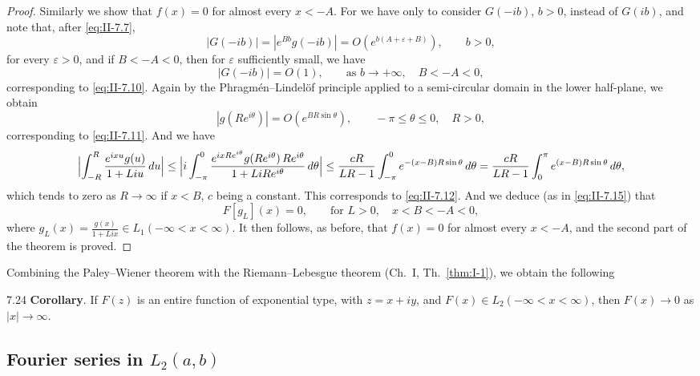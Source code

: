 \begin{proof}
Similarly we show that $f(x)=0$ for almost every $x<-A$. For we have only to consider $G(-ib)$, $b>0$, instead of $G(ib)$, and note that, after \eqref{eq:II-7.7},
\begin{equation}\tag{7.20}\label{eq:II-7.20}
|G(-ib)|=|e^{Bb}g(-ib)|=O(e^{b(A+\varepsilon+B)}),\qquad b>0,
\end{equation}
for every $\varepsilon>0$, and if $B<-A<0$, then for $\varepsilon$ sufficiently small, we have
\begin{equation}\tag{7.21}\label{eq:II-7.21}
|G(-ib)|=O(1),\qquad\text{as }b\to+\infty,\quad B<-A<0,
\end{equation}
corresponding to \eqref{eq:II-7.10}. Again by the Phragm\'en--Lindel\"of principle applied to a semi-circular domain in the lower half-plane, we obtain
\begin{equation}\tag{7.22}\label{eq:II-7.22}
|g(Re^{i\theta})|=O(e^{BR\sin\theta}),\qquad -\pi\le\theta\le 0,\quad R>0,
\end{equation}
corresponding to \eqref{eq:II-7.11}. And we have
\[
\Bigl|\int_{-R}^{R}\frac{e^{ixu}g(u)}{1+Liu}\,du\Bigr|
\le\Bigl|i\int_{-\pi}^{0}\frac{e^{ixRe^{i\theta}}g(Re^{i\theta})\,Re^{i\theta}}{1+LiRe^{i\theta}}\,d\theta\Bigr|
\le\frac{cR}{LR-1}\int_{-\pi}^{0}e^{-(x-B)R\sin\theta}\,d\theta
=\frac{cR}{LR-1}\int_{0}^{\pi}e^{(x-B)R\sin\theta}\,d\theta,
\]
which tends to zero as $R\to\infty$ if $x<B$, $c$ being a constant. This corresponds to \eqref{eq:II-7.12}. And we deduce (as in \eqref{eq:II-7.15}) that
\begin{equation}\tag{7.23}\label{eq:II-7.23}
F[g_{L}](x)=0,\qquad\text{for }L>0,\quad x<B<-A<0,
\end{equation}
where $g_{L}(x)=\frac{g(x)}{1+Lix}\in L_{1}(-\infty<x<\infty)$. It then follows, as before, that $f(x)=0$ for almost every $x<-A$, and the second part of the theorem is proved.
\end{proof}

Combining the Paley--Wiener theorem with the Riemann--Lebesgue theorem (Ch.~I, Th.~\ref{thm:I-1}), we obtain the following

\begin{nstmt}{7.24}\label{eq:II-7.24}
\textbf{Corollary}. If $F(z)$ is an entire function of exponential type, with $z=x+iy$, and $F(x)\in L_{2}(-\infty<x<\infty)$, then $F(x)\to 0$ as $|x|\to\infty$.
\end{nstmt}

\subsection*{Fourier series in $L_{2}(a,b)$}
\setcounter{section}{7}
